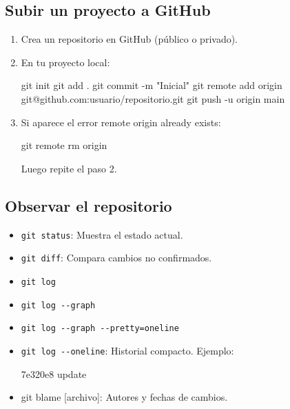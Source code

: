 \documentclass[
  doc,
  floatsintext,
  longtable,
  a4paper,
  nolmodern,
  notxfonts,
  notimes,
  colorlinks=true,linkcolor=blue,citecolor=blue,urlcolor=blue]{apa7}
\newenvironment{Shaded}{\begin{snugshade}}{\end{snugshade}}
\newcommand{\AttributeTok}[1]{\textcolor[rgb]{0.40,0.45,0.13}{#1}}
\newcommand{\ExtensionTok}[1]{\textcolor[rgb]{0.00,0.23,0.31}{#1}}
\newcommand{\FunctionTok}[1]{\textcolor[rgb]{0.28,0.35,0.67}{#1}}
\newcommand{\NormalTok}[1]{\textcolor[rgb]{0.00,0.23,0.31}{#1}}
\newcommand{\StringTok}[1]{\textcolor[rgb]{0.13,0.47,0.30}{#1}}
\begin{document}
\subsection{Subir un proyecto a
GitHub}\label{subir-un-proyecto-a-github}

\begin{enumerate}
\def\labelenumi{\arabic{enumi}.}
\item
  Crea un repositorio en GitHub (público o privado).
\item
  En tu proyecto local:

\begin{Shaded}
\begin{Highlighting}[]
\FunctionTok{git}\NormalTok{ init}
\FunctionTok{git}\NormalTok{ add .}
\FunctionTok{git}\NormalTok{ commit }\AttributeTok{{-}m} \StringTok{"Inicial"}
\FunctionTok{git}\NormalTok{ remote add origin git@github.com:usuario/repositorio.git}
\FunctionTok{git}\NormalTok{ push }\AttributeTok{{-}u}\NormalTok{ origin main}
\end{Highlighting}
\end{Shaded}
\item
  Si aparece el error remote origin already exists:

\begin{Shaded}
\begin{Highlighting}[]
\FunctionTok{git}\NormalTok{ remote rm origin}
\end{Highlighting}
\end{Shaded}

  Luego repite el paso 2.
\end{enumerate}

\subsection{Observar el repositorio}\label{observar-el-repositorio}

\begin{itemize}
\item
  \texttt{git\ status}: Muestra el estado actual.
\item
  \texttt{git\ diff}: Compara cambios no confirmados.
\item
  \texttt{git\ log}
\item
  \texttt{git\ log\ -\/-graph}
\item
  \texttt{git\ log\ -\/-graph\ -\/-pretty=oneline}
\item
  \texttt{git\ log\ -\/-oneline}: Historial compacto. Ejemplo:

\begin{Shaded}
\begin{Highlighting}[]
\ExtensionTok{7e320e8}\NormalTok{ update}
\end{Highlighting}
\end{Shaded}
\item
  git blame {[}archivo{]}: Autores y fechas de cambios.
\end{itemize}
\end{document}
